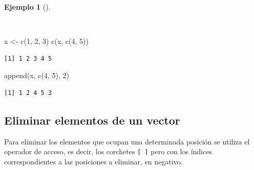 \documentclass[
  a4paper,
]{scrreport}
\newenvironment{Shaded}{\begin{snugshade}}{\end{snugshade}}
\newcommand{\DecValTok}[1]{\textcolor[rgb]{0.68,0.00,0.00}{#1}}
\newcommand{\FunctionTok}[1]{\textcolor[rgb]{0.28,0.35,0.67}{#1}}
\newcommand{\NormalTok}[1]{\textcolor[rgb]{0.00,0.23,0.31}{#1}}
\newcommand{\OtherTok}[1]{\textcolor[rgb]{0.00,0.23,0.31}{#1}}
\theoremstyle{definition}
\theoremstyle{definition}
\newtheorem{example}{Ejemplo}[chapter]
\theoremstyle{remark}
\begin{document}
\begin{example}[]\protect\hypertarget{exm-añadir-elementos-vector}{}\label{exm-añadir-elementos-vector}

~

\begin{Shaded}
\begin{Highlighting}[]
\NormalTok{x }\OtherTok{\textless{}{-}} \FunctionTok{c}\NormalTok{(}\DecValTok{1}\NormalTok{, }\DecValTok{2}\NormalTok{, }\DecValTok{3}\NormalTok{)}
\FunctionTok{c}\NormalTok{(x, }\FunctionTok{c}\NormalTok{(}\DecValTok{4}\NormalTok{, }\DecValTok{5}\NormalTok{))}
\end{Highlighting}
\end{Shaded}

\begin{verbatim}
[1] 1 2 3 4 5
\end{verbatim}

\begin{Shaded}
\begin{Highlighting}[]
\FunctionTok{append}\NormalTok{(x, }\FunctionTok{c}\NormalTok{(}\DecValTok{4}\NormalTok{, }\DecValTok{5}\NormalTok{), }\DecValTok{2}\NormalTok{)}
\end{Highlighting}
\end{Shaded}

\begin{verbatim}
[1] 1 2 4 5 3
\end{verbatim}

\end{example}

\subsection{Eliminar elementos de un
vector}\label{eliminar-elementos-de-un-vector}

Para eliminar los elementos que ocupan una determinada posición se
utiliza el operador de acceso, es decir, los corchetes \texttt{{[}\ {]}}
pero con los índices correspondientes a las posiciones a eliminar, en
negativo.
\end{document}
